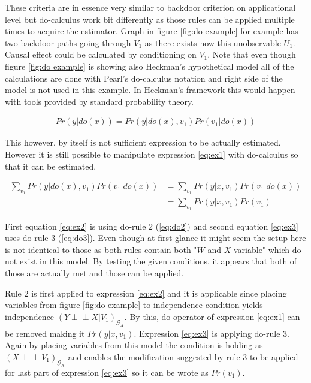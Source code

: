 \documentclass[main=english,12pt,a4paper,pdftex,econ,utf8]{aaltothesis}
\newcommand{\indep}{\perp \!\!\! \perp}
\newcommand{\g}{\mathcal{G}}
\begin{document}
These criteria are in essence very similar to backdoor criterion on applicational level but do-calculus work bit differently as those rules can be applied multiple times to acquire the estimator. Graph in figure \ref{fig:do example} for example has two backdoor paths going through $V_{1}$ as there exists now this unobservable $U_1$. Causal effect could be calculated by conditioning on $V_1$. Note that even though figure \ref{fig:do example} is showing also Heckman's hypothetical model all of the calculations are done with Pearl's do-calculus notation and right side of the model is not used in this example. In Heckman's framework this would happen with tools provided by standard probability theory.



\begin{gather}
    Pr(y|do(x))=Pr(y|do(x),v_1)Pr(v_1|do(x)) \label{eq:ex1}
\end{gather}

\noindent This however, by itself is not sufficient expression to be actually estimated. However it is still possible to manipulate expression \ref{eq:ex1}  with do-calculus so that it can be estimated.

\begin{align}
    \sum_{v_1}Pr(y|do(x), v_1)Pr(v_1|do(x))&=\sum_{v_1}Pr(y|x, v_1)Pr(v_1|do(x)) \label{eq:ex2} \\
    &=\sum_{v_1}Pr(y|x, v_1)Pr(v_1) \label{eq:ex3}
\end{align}

First equation \ref{eq:ex2} is using do-rule 2 (\ref{eq:do2}) and second equation \ref{eq:ex3} uses do-rule 3 (\ref{eq:do3}). Even though at first glance it might seem the setup here is not identical to those as both rules contain both "$W$ and $X$-variable" which do not exist in this model. By testing the given conditions, it appears that both of those are actually met and those can be applied.

Rule 2 is first applied to expression \ref{eq:ex2} and it is applicable since placing variables from figure \ref{fig:do example} to independence condition yields independence $(Y \indep X|V_{1})_{\g_{\underline{X}}}$. By this, do-operator of expression \ref{eq:ex1} can be removed making it $Pr(y|x,v_1)$. Expression \ref{eq:ex3} is applying do-rule 3. Again by placing variables from this model the condition is holding as $(X\indep V_{1})_{\g_{\overline{X}}}$ and enables the modification suggested by rule 3 to be applied for last part of expression \ref{eq:ex3} so it can be wrote as $Pr(v_{1})$.
\end{document}
